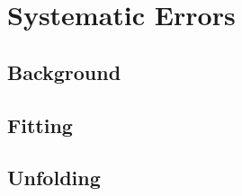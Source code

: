 
\section{Systematic Errors}
\label{sec:exp}

\subsection{Background}
\label{sec:syst_bg}

\subsection{Fitting}
\label{sec:syst_fit}

\subsection{Unfolding}
\label{sec:syst_unf}